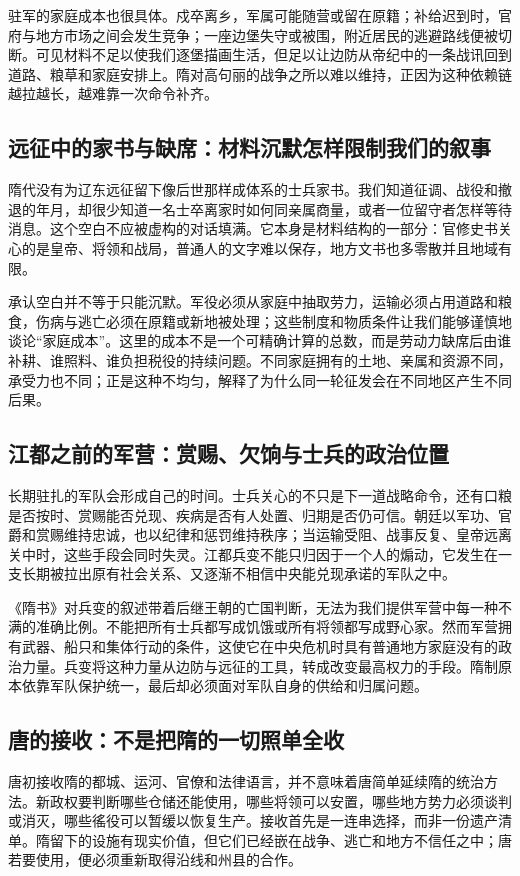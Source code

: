 驻军的家庭成本也很具体。戍卒离乡，军属可能随营或留在原籍；补给迟到时，官府与地方市场之间会发生竞争；一座边堡失守或被围，附近居民的逃避路线便被切断。可见材料不足以使我们逐堡描画生活，但足以让边防从帝纪中的一条战讯回到道路、粮草和家庭安排上。隋对高句丽的战争之所以难以维持，正因为这种依赖链越拉越长，越难靠一次命令补齐。

\subsection{远征中的家书与缺席：材料沉默怎样限制我们的叙事}
隋代没有为辽东远征留下像后世那样成体系的士兵家书。我们知道征调、战役和撤退的年月，却很少知道一名士卒离家时如何同亲属商量，或者一位留守者怎样等待消息。这个空白不应被虚构的对话填满。它本身是材料结构的一部分：官修史书关心的是皇帝、将领和战局，普通人的文字难以保存，地方文书也多零散并且地域有限。

承认空白并不等于只能沉默。军役必须从家庭中抽取劳力，运输必须占用道路和粮食，伤病与逃亡必须在原籍或新地被处理；这些制度和物质条件让我们能够谨慎地谈论“家庭成本”。这里的成本不是一个可精确计算的总数，而是劳动力缺席后由谁补耕、谁照料、谁负担税役的持续问题。不同家庭拥有的土地、亲属和资源不同，承受力也不同；正是这种不均匀，解释了为什么同一轮征发会在不同地区产生不同后果。

\subsection{江都之前的军营：赏赐、欠饷与士兵的政治位置}
长期驻扎的军队会形成自己的时间。士兵关心的不只是下一道战略命令，还有口粮是否按时、赏赐能否兑现、疾病是否有人处置、归期是否仍可信。朝廷以军功、官爵和赏赐维持忠诚，也以纪律和惩罚维持秩序；当运输受阻、战事反复、皇帝远离关中时，这些手段会同时失灵。江都兵变不能只归因于一个人的煽动，它发生在一支长期被拉出原有社会关系、又逐渐不相信中央能兑现承诺的军队之中。

《隋书》对兵变的叙述带着后继王朝的亡国判断，无法为我们提供军营中每一种不满的准确比例。不能把所有士兵都写成饥饿或所有将领都写成野心家。然而军营拥有武器、船只和集体行动的条件，这使它在中央危机时具有普通地方家庭没有的政治力量。兵变将这种力量从边防与远征的工具，转成改变最高权力的手段。隋制原本依靠军队保护统一，最后却必须面对军队自身的供给和归属问题。

\subsection{唐的接收：不是把隋的一切照单全收}
唐初接收隋的都城、运河、官僚和法律语言，并不意味着唐简单延续隋的统治方法。新政权要判断哪些仓储还能使用，哪些将领可以安置，哪些地方势力必须谈判或消灭，哪些徭役可以暂缓以恢复生产。接收首先是一连串选择，而非一份遗产清单。隋留下的设施有现实价值，但它们已经嵌在战争、逃亡和地方不信任之中；唐若要使用，便必须重新取得沿线和州县的合作。

